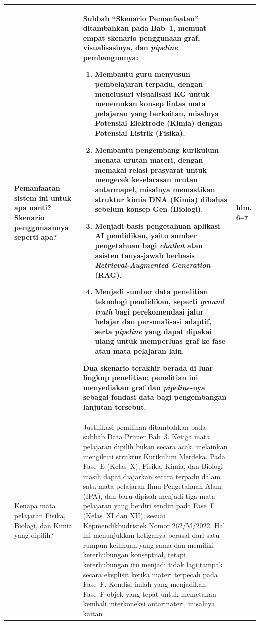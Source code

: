 \documentclass[12pt, a4paper]{article}
\begin{document}
\begin{longtable}{|
  >{\centering\arraybackslash}p{\revisionNoCol}|
  p{\revisionNoteCol}|
  p{\revisionResultCol}|
  >{\centering\arraybackslash}p{\revisionPageCol}|}
3 & Pemanfaatan sistem ini untuk apa nanti? Skenario penggunaannya seperti
apa? &
Subbab ``Skenario Pemanfaatan'' ditambahkan pada Bab~1, memuat empat skenario
penggunaan graf, visualisasinya, dan \textit{pipeline} pembangunnya:
\begin{enumerate}[leftmargin=1.1em, itemsep=1pt, parsep=0pt, topsep=0pt]
  \item \textbf{Membantu guru menyusun pembelajaran terpadu}, dengan menelusuri
        visualisasi KG untuk menemukan konsep lintas mata pelajaran yang
        berkaitan, misalnya Potensial Elektrode (Kimia) dengan Potensial Listrik
        (Fisika).
  \item \textbf{Membantu pengembang kurikulum menata urutan materi}, dengan
        memakai relasi prasyarat untuk mengecek keselarasan urutan antarmapel,
        misalnya memastikan struktur kimia DNA (Kimia) dibahas sebelum konsep
        Gen (Biologi).
  \item \textbf{Menjadi basis pengetahuan aplikasi AI pendidikan}, yaitu sumber
        pengetahuan bagi \textit{chatbot} atau asisten tanya-jawab berbasis
        \textit{Retrieval-Augmented Generation} (RAG).
  \item \textbf{Menjadi sumber data penelitian teknologi pendidikan}, seperti
        \textit{ground truth} bagi perekomendasi jalur belajar dan personalisasi
        adaptif, serta \textit{pipeline} yang dapat dipakai ulang untuk
        memperluas graf ke fase atau mata pelajaran lain.
\end{enumerate}
Dua skenario terakhir berada di luar lingkup penelitian; penelitian ini
menyediakan graf dan \textit{pipeline}-nya sebagai fondasi data bagi
pengembangan lanjutan tersebut. &
hlm. 6--7 \\
\hline
4 & Kenapa mata pelajaran Fisika, Biologi, dan Kimia yang dipilih? &
Justifikasi pemilihan ditambahkan pada subbab Data Primer Bab~3. Ketiga mata
pelajaran dipilih bukan secara acak, melainkan mengikuti struktur Kurikulum
Merdeka. Pada Fase~E (Kelas~X), Fisika, Kimia, dan Biologi masih dapat diajarkan
secara terpadu dalam satu mata pelajaran Ilmu Pengetahuan Alam (IPA), dan baru
dipisah menjadi tiga mata pelajaran yang berdiri sendiri pada Fase~F (Kelas~XI
dan XII), sesuai Kepmendikbudristek Nomor 262/M/2022. Hal ini menunjukkan
ketiganya berasal dari satu rumpun keilmuan yang sama dan memiliki keterhubungan
konseptual, tetapi keterhubungan itu menjadi tidak lagi tampak secara eksplisit
ketika materi terpecah pada Fase~F. Kondisi inilah yang menjadikan Fase~F objek
yang tepat untuk memetakan kembali interkoneksi antarmateri, misalnya kaitan

\end{longtable}
\end{document}
